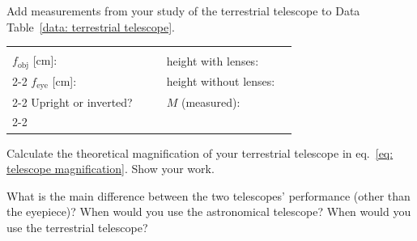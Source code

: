 \documentclass[addpoints]{physlabs}
\begin{document}
\begin{postlab}

    \pagebreak


        \filbreak
        \question[1] Add measurements from your study of the terrestrial telescope to Data Table~\ref{data: terrestrial telescope}.

        \begin{center}
            \renewcommand{\arraystretch}{2}
            \captionsetup{font=normalsize}
            \begin{tabular}{l>{\centering\arraybackslash}p{3cm}cl>{\centering\arraybackslash}p{3cm}}
                \hline
                & & & & \\
                $f_\text{obj}$ [cm]: & & & height with lenses: & \\
                \cline{2-2}\cline{5-5}
                $f_\text{eye}$ [cm]: & & & height without lenses: & \\
                \cline{2-2}\cline{5-5}
                Upright or inverted? & & & $M$ (measured): & \\
                \cline{2-2}\cline{5-5}
            \end{tabular}
        \end{center}
        \begin{solution}[1cm]   
        \end{solution}

        \filbreak
        \question[1] Calculate the theoretical magnification of your terrestrial telescope in eq.~\ref{eq: telescope magnification}. Show your work.
        \begin{solution}[3cm]   
        \end{solution}

        \filbreak
        \question[1] What is the main difference between the two telescopes' performance (other than the eyepiece)? When would you use the astronomical telescope? When would you use the terrestrial telescope?
        \begin{solution}[3cm]   
        \end{solution}
    
    
\end{postlab}
\end{document}
